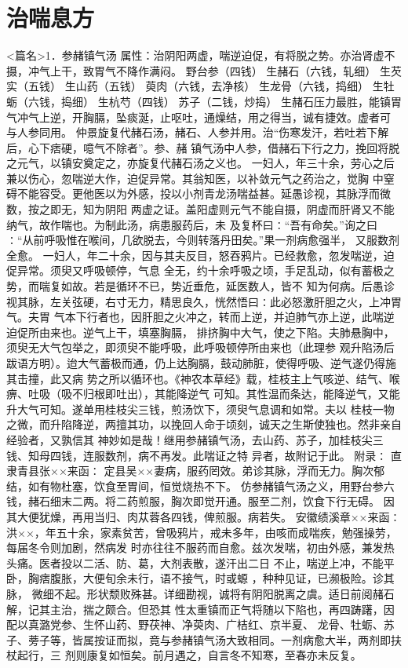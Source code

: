 \documentclass[a4paper,12pt,UTF8,twoside]{ctexbook}
\begin{document}
\chapter{治喘息方}
<篇名>1．参赭镇气汤
属性：治阴阳两虚，喘逆迫促，有将脱之势。亦治肾虚不摄，冲气上干，致胃气不降作满闷。 
野台参（四钱） 生赭石（六钱，轧细） 生芡实（五钱） 生山药（五钱） 萸肉（六钱，去净核） 
生龙骨（六钱，捣细） 生牡蛎（六钱，捣细） 生杭芍（四钱） 苏子（二钱，炒捣） 
生赭石压力最胜，能镇胃气冲气上逆，开胸膈，坠痰涎，止呕吐，通燥结，用之得当，诚有捷效。虚者可 
与人参同用。 
仲景旋复代赭石汤，赭石、人参并用。治“伤寒发汗，若吐若下解后，心下痞硬，噫气不除者”。参、赭 
镇气汤中人参，借赭石下行之力，挽回将脱之元气，以镇安奠定之，亦旋复代赭石汤之义也。 
一妇人，年三十余，劳心之后兼以伤心，忽喘逆大作，迫促异常。其翁知医，以补敛元气之药治之，觉胸 
中窒碍不能容受。更他医以为外感，投以小剂青龙汤喘益甚。延愚诊视，其脉浮而微数，按之即无，知为阴阳 
两虚之证。盖阳虚则元气不能自摄，阴虚而肝肾又不能纳气，故作喘也。为制此汤，病患服药后，未 
及复杯曰∶“吾有命矣。”询之曰∶“从前呼吸惟在喉间，几欲脱去，今则转落丹田矣。”果一剂病愈强半， 
又服数剂全愈。 
一妇人，年二十余，因与其夫反目，怒吞鸦片。已经救愈，忽发喘逆，迫促异常。须臾又呼吸顿停，气息 
全无，约十余呼吸之顷，手足乱动，似有蓄极之势，而喘复如故。若是循环不已，势近垂危，延医数人，皆不 
知为何病。后愚诊视其脉，左关弦硬，右寸无力，精思良久，恍然悟曰∶此必怒激肝胆之火，上冲胃气。夫胃 
气本下行者也，因肝胆之火冲之，转而上逆，并迫肺气亦上逆，此喘逆迫促所由来也。逆气上干，填塞胸膈， 
排挤胸中大气，使之下陷。夫肺悬胸中，须臾无大气包举之，即须臾不能呼吸，此呼吸顿停所由来也（此理参 
观升陷汤后跋语方明）。迨大气蓄极而通，仍上达胸膈，鼓动肺脏，使得呼吸、逆气遂仍得施其击撞，此又病 
势之所以循环也。《神农本草经》载，桂枝主上气咳逆、结气、喉痹、吐吸（吸不归根即吐出），其能降逆气 
可知。其性温而条达，能降逆气，又能升大气可知。遂单用桂枝尖三钱，煎汤饮下，须臾气息调和如常。夫以 
桂枝一物之微，而升陷降逆，两擅其功，以挽回人命于顷刻，诚天之生斯使独也。然非亲自经验者，又孰信其 
神妙如是哉！继用参赭镇气汤，去山药、苏子，加桂枝尖三钱、知母四钱，连服数剂，病不再发。此喘证之特 
异者，故附记于此。 
附录∶ 
直隶青县张××来函∶ 
定县吴××妻病，服药罔效。弟诊其脉，浮而无力。胸次郁结，如有物杜塞，饮食至胃间，恒觉烧热不下。 
仿参赭镇气汤之义，用野台参六钱，赭石细末二两。将二药煎服，胸次即觉开通。服至二剂，饮食下行无碍。 
因其大便犹燥，再用当归、肉苁蓉各四钱，俾煎服。病若失。 
安徽绩溪章××来函∶ 
洪××，年五十余，家素贫苦，曾吸鸦片，戒未多年，由咳而成喘疾，勉强操劳，每届冬令则加剧，然病发 
时亦往往不服药而自愈。兹次发喘，初由外感，兼发热头痛。医者投以二活、防、葛，大剂表散，遂汗出二日 
不止，喘逆上冲，不能平卧，胸痞腹胀，大便旬余未行，语不接气，时或螈 ，种种见证，已濒极险。诊其脉， 
微细不起。形状颓败殊甚。详细勘视，诚将有阴阳脱离之虞。适日前阅赭石解，记其主治，揣之颇合。但恐其 
性太重镇而正气将随以下陷也，再四踌躇，因配以真潞党参、生怀山药、野茯神、净萸肉、广桔红、京半夏、 
龙骨、牡蛎、苏子、蒡子等，皆属按证而拟，竟与参赭镇气汤大致相同。一剂病愈大半，两剂即扶杖起行，三 
剂则康复如恒矣。前月遇之，自言冬不知寒，至春亦未反复。 
\end{document}
